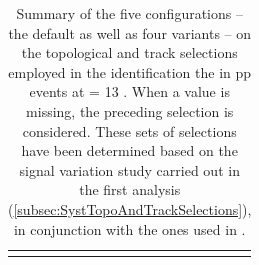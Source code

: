 \begin{table}[t]
\begin{tabular}{c|c|c|c|c|c}
    \noalign{\smallskip}\hline \noalign{\smallskip}
    \end{tabular}
    \caption{Summary of the five configurations -- the default as well as four variants -- on the topological and track selections employed in the identification the \rmXiPM in pp events at \sqrtS = 13 \tev. When a value is missing, the preceding selection is considered. These sets of selections have been determined based on the signal variation study carried out in the first analysis (\Sec\ref{subsec:SystTopoAndTrackSelections}), in conjunction with the ones used in \cite{alicecollaborationMultiplicityDependenceMulti2020}.}\label{tab:SystTopoCorrelatedAnalysisXi}
\end{table}

%    
%    
